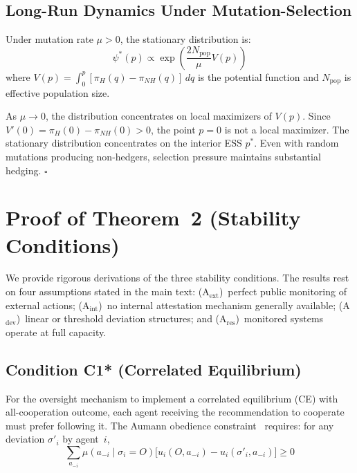 \documentclass[11pt]{article}
\begin{document}
\subsection{Long-Run Dynamics Under Mutation-Selection}
\label{sec:S3.5}

Under mutation rate $\mu > 0$, the stationary distribution is:
\begin{equation}
\psi^*(p) \propto \exp\left(\frac{2N_{\text{pop}}}{\mu}V(p)\right)
\end{equation}
where $V(p) = \int_0^p [\pi_H(q) - \pi_{NH}(q)]\,dq$ is the potential function and $N_{\text{pop}}$ is effective population size.

As $\mu \to 0$, the distribution concentrates on local maximizers of $V(p)$. Since $V'(0) = \pi_H(0) - \pi_{NH}(0) > 0$, the point $p=0$ is not a local maximizer. The stationary distribution concentrates on the interior ESS $p^*$. Even with random mutations producing non-hedgers, selection pressure maintains substantial hedging. \hfill$\square$


\section{Proof of Theorem~2 (Stability Conditions)}
\label{sec:S4}

We provide rigorous derivations of the three stability conditions. The results rest on four assumptions stated in the main text: (A$_{\text{ext}}$)~perfect public monitoring of external actions; (A$_{\text{int}}$)~no internal attestation mechanism generally available; (A$_{\text{dev}}$)~linear or threshold deviation structures; and (A$_{\text{res}}$)~monitored systems operate at full capacity.

\subsection{Condition C1* (Correlated Equilibrium)}
\label{sec:S4.1}

For the oversight mechanism to implement a correlated equilibrium (CE) with all-cooperation outcome, each agent receiving the recommendation to cooperate must prefer following it. The Aumann obedience constraint~\cite{aumann.1974,aumann.1987} requires: for any deviation $\sigma'_i$ by agent~$i$,
\begin{equation}
\sum_{a_{-i}} \mu(a_{-i} \mid \sigma_i = O)\bigl[u_i(O,a_{-i}) - u_i(\sigma'_i,a_{-i})\bigr] \geq 0
\end{equation}
\end{document}
